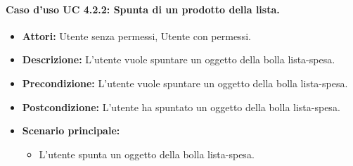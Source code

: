 \paragraph{Caso d'uso UC 4.2.2: Spunta di un prodotto della lista.}
\label{Caso d'uso UC 4.2.2: Spunta di un prodotto della lista.}

\FloatBarrier
\begin{itemize}
\item \textbf{Attori:} Utente senza permessi, Utente con permessi.
\item \textbf{Descrizione:} L'utente vuole spuntare un oggetto della bolla lista-spesa.
\item \textbf{Precondizione:} L'utente vuole spuntare un oggetto della bolla lista-spesa. 
\item \textbf{Postcondizione:} L'utente ha spuntato un oggetto della bolla lista-spesa.
\item \textbf{Scenario principale:}
	\begin{itemize}
	\item{L'utente spunta un oggetto della bolla lista-spesa.}
	\end{itemize}
\end{itemize}